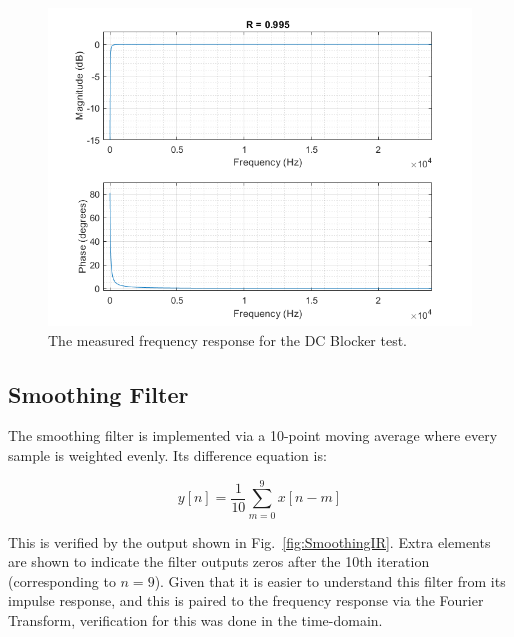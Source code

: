 \documentclass[../main.tex]{subfiles}
\begin{document}
\begin{figure}[h]
    \centering
    \includegraphics[scale=.53]{./images/plots/DCBlockerResponse.png}
    \caption{The measured frequency response for the DC Blocker test.}
    \label{fig:DCBlockerResponse}
\end{figure}

\subsection{Smoothing Filter}
The smoothing filter is implemented via a 10-point moving average where every sample is weighted evenly. Its difference equation is:

\begin{equation}
    y[n] = \frac{1}{10} \sum_{m = 0}^{9}x[n-m]  
\end{equation}

This is verified by the output shown in Fig.~\ref{fig:SmoothingIR}. Extra elements are shown to indicate the filter outputs zeros after the 10th iteration (corresponding to $n = 9$). Given that it is easier to understand this filter from its impulse response, and this is paired to the frequency response via the Fourier Transform, verification for this was done in the time-domain.
\end{document}
